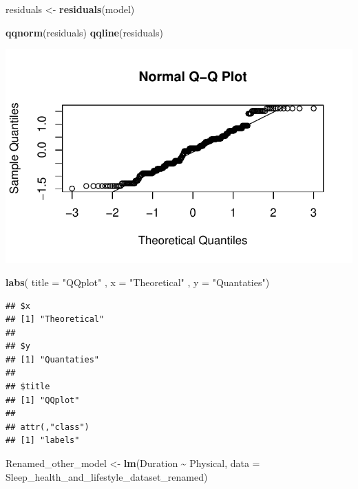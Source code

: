 \documentclass[
  11pt,
]{article}
\newenvironment{Shaded}{\begin{snugshade}}{\end{snugshade}}
\newcommand{\AttributeTok}[1]{\textcolor[rgb]{0.13,0.29,0.53}{#1}}
\newcommand{\FunctionTok}[1]{\textcolor[rgb]{0.13,0.29,0.53}{\textbf{#1}}}
\newcommand{\NormalTok}[1]{#1}
\newcommand{\OtherTok}[1]{\textcolor[rgb]{0.56,0.35,0.01}{#1}}
\newcommand{\SpecialCharTok}[1]{\textcolor[rgb]{0.81,0.36,0.00}{\textbf{#1}}}
\newcommand{\StringTok}[1]{\textcolor[rgb]{0.31,0.60,0.02}{#1}}
\begin{document}
\begin{Shaded}
\begin{Highlighting}[]
\NormalTok{residuals }\OtherTok{\textless{}{-}} \FunctionTok{residuals}\NormalTok{(model)}

\FunctionTok{qqnorm}\NormalTok{(residuals)}
\FunctionTok{qqline}\NormalTok{(residuals)}
\end{Highlighting}
\end{Shaded}

\begin{center}\includegraphics[width=0.7\linewidth]{SleepHelath_files/figure-latex/unnamed-chunk-48-1} \end{center}

\begin{Shaded}
\begin{Highlighting}[]
\FunctionTok{labs}\NormalTok{( }\AttributeTok{title  =} \StringTok{"QQplot"}\NormalTok{ , }\AttributeTok{x =} \StringTok{"Theoretical"}\NormalTok{ , }\AttributeTok{y =} \StringTok{"Quantaties"}\NormalTok{)}
\end{Highlighting}
\end{Shaded}

\begin{verbatim}
## $x
## [1] "Theoretical"
## 
## $y
## [1] "Quantaties"
## 
## $title
## [1] "QQplot"
## 
## attr(,"class")
## [1] "labels"
\end{verbatim}

\begin{Shaded}
\begin{Highlighting}[]
\NormalTok{Renamed\_other\_model }\OtherTok{\textless{}{-}} \FunctionTok{lm}\NormalTok{(Duration }\SpecialCharTok{\textasciitilde{}}\NormalTok{ Physical, }\AttributeTok{data =}\NormalTok{ Sleep\_health\_and\_lifestyle\_dataset\_renamed)}
\end{Highlighting}
\end{Shaded}

\begin{Shaded}
\end{Shaded}
\end{document}
